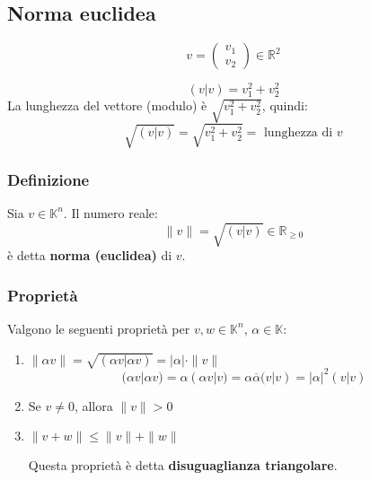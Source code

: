 \documentclass[a4paper]{article}
\theoremstyle{break}
\theoremstyle{break}
\theoremstyle{break}
\theoremstyle{break}
\begin{document}
\subsection{Norma euclidea}
\label{11.2}
\begin{example}
  \[
  v = \begin{pmatrix} v_1\\v_2 \end{pmatrix} \in \mathbb{R}^2
  \] 
  \begin{figure}[H]
    \centering
  \end{figure}
  \[
    (v|v) = v_1^2 + v_2^2
  \] 
  La lunghezza del vettore (modulo) è \( \sqrt{v_1^2 + v_2^2} \), quindi:
  \[
  \sqrt{(v|v)} = \sqrt{v_1^2 + v_2^2} = \text{ lunghezza di } v
  \] 
\end{example}

\subsubsection{Definizione}
Sia \( v \in \mathbb{K}^n \). Il numero reale:
\[
 \|v\| = \sqrt{(v|v)} \in \mathbb{R}_{\ge 0}
\] 
è detta \textbf{norma (euclidea)} di \( v \).

\subsubsection{Proprietà}
Valgono le seguenti proprietà per \( v,w \in \mathbb{K}^n \), \( \alpha \in \mathbb{K} \):
\begin{enumerate}
  \item \( \|\alpha v\| = \sqrt{(\alpha v| \alpha v)} = |\alpha| \cdot \|v\| \) 
    \[
      (\alpha v| \alpha v) = \alpha (\alpha v|v) = \alpha \overline{\alpha}(v|v) =
      |\alpha|^2(v|v)
    \] 

  \item Se \( v \neq 0 \), allora \( \|v\| > 0 \) 

  \item \( \|v+w\| \le \|v\| + \|w\| \) 

    \noindent Questa proprietà è detta \textbf{disuguaglianza triangolare}.
\end{enumerate}
\end{document}
